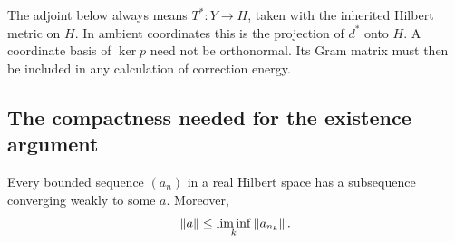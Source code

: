 The adjoint below always means $T^*:Y\to H$, taken with the inherited Hilbert metric on $H$. In ambient coordinates this is the projection of $d^*$ onto $H$. A coordinate basis of $\ker p$ need not be orthonormal. Its Gram matrix must then be included in any calculation of correction energy.

\subsection{The compactness needed for the existence argument}
\begin{lemma}\label{lem:weak-subsequence}
Every bounded sequence $(a_n)$ in a real Hilbert space has a subsequence converging weakly to some $a$. Moreover,
\[
 \left\lVert a\right\rVert\le\liminf_k\left\lVert a_{n_k}\right\rVert.
\]
\end{lemma}
